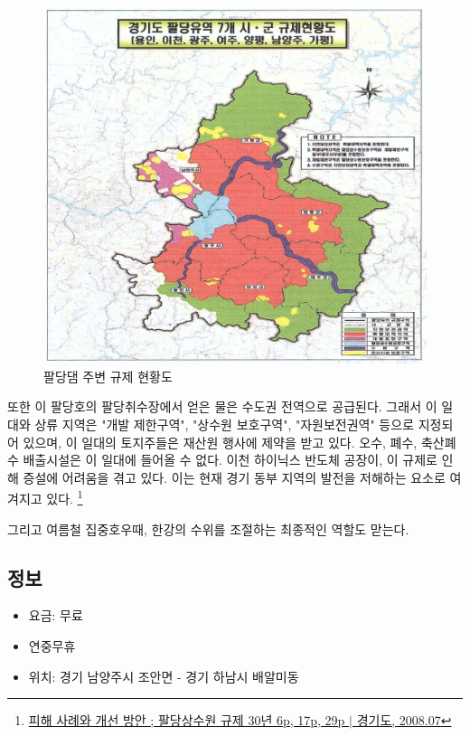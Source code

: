 \documentclass[chapter, oneside]{oblivoir}
\begin{document}
\begin{figure}
    \centering
    \includegraphics[width=1\textwidth]{img/규제현황도.PNG}
    \caption{팔당댐 주변 규제 현황도 \protect\footnotemark}
    \label{fig:my_label0}
\end{figure}
\footnotetext{\ref{paldang}}


또한 이 팔당호의 팔당취수장에서 얻은 물은 수도권 전역으로 공급된다.
그래서 이 일대와 상류 지역은 "개발 제한구역", "상수원 보호구역", "자원보전권역" 
등으로 지정되어 있으며,
이 일대의 토지주들은 재산원 행사에 제약을 받고 있다.
오수, 폐수, 축산폐수 배출시설은 이 일대에 들어올 수 없다.
이천 하이닉스 반도체 공장이, 이 규제로 인해 증설에 어려움을 겪고 있다.
이는 현재 경기 동부 지역의 발전을 저해하는 요소로 여겨지고 있다.
\footnote{\href{https://memory.library.kr/items/show/37492}{피해 사례와 개선 방안 ; 팔당상수원 규제 30년 6p, 17p, 29p $|$ 경기도, 2008.07}}

그리고 여름철 집중호우때, 한강의 수위를 조절하는 최종적인 역할도 맏는다.


\subsection{정보}
\begin{itemize}
    \item 요금: 무료
    \item 연중무휴
    \item 위치: 경기 남양주시 조안면 - 경기 하남시 배알미동
\end{itemize}
\end{document}
